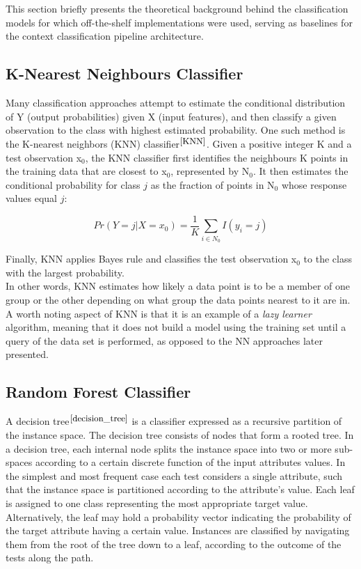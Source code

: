 This section briefly presents the theoretical background behind the classification models for which off-the-shelf implementations were used, serving as baselines for the context classification pipeline architecture. 

\subsection{K-Nearest Neighbours Classifier}
Many classification approaches attempt to estimate the conditional distribution of Y (output probabilities) given X (input features), and then classify a given observation to the class with highest estimated probability. One such method is the K-nearest neighbors (KNN) classifier$^{\small \cite{KNN}}$. Given a positive integer K and a test observation x$_0$, the KNN classifier first identifies the neighbours K points in the training data that are closest to x$_0$, represented by N$_0$. It then estimates the conditional probability for class $j$ as the fraction of points in N$_0$ whose response values equal $j$:

\begin{equation}
    Pr(Y = j|X = x_0) = \frac{1}{K} \sum_{i \in N_0} I(y_i = j)
\end{equation}

Finally, KNN applies Bayes rule and classifies the test observation x$_0$ to
the class with the largest probability. \\

In other words, KNN estimates how likely a data point is to be a member of one group or the other depending on what group the data points nearest to it are in. A worth noting aspect of KNN is that it is an example of a \textit{lazy learner} algorithm, meaning that it does not build a model using the training set until a query of the data set is performed, as opposed to the NN approaches later presented. \\




\subsection{Random Forest Classifier}

A decision tree$^{\small \cite{decision_tree}}$ is a classifier expressed as a recursive partition of the instance space. The decision tree consists of nodes that form a rooted tree. In a decision tree, each internal node splits the instance space into two or more sub-spaces according to a certain discrete function of the input attributes values. In the simplest and most frequent case each test considers a single attribute, such that the instance space is partitioned according to the attribute’s value. Each leaf is assigned to one class representing the most appropriate target value. Alternatively, the leaf may hold a probability vector indicating the probability of the target attribute having a certain value. Instances are classified by navigating them from the root of the tree down to a leaf, according to the outcome of the tests along the path. \\

